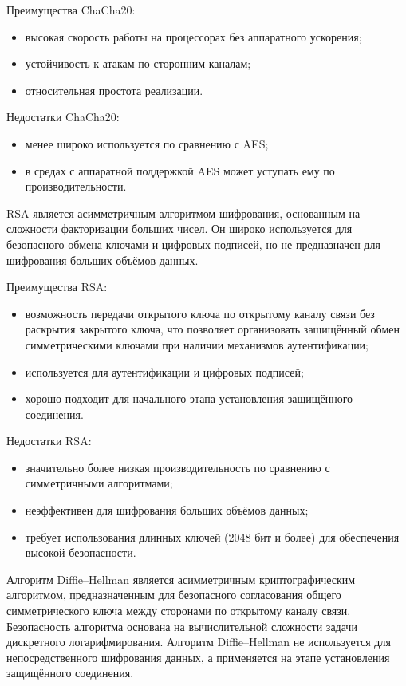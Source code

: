 Преимущества ChaCha20:

\begin{itemize}
    \item высокая скорость работы на процессорах без аппаратного ускорения;
    \item устойчивость к атакам по сторонним каналам;
    \item относительная простота реализации.
\end{itemize}

Недостатки ChaCha20:

\begin{itemize}
    \item менее широко используется по сравнению с AES;
    \item в средах с аппаратной поддержкой AES может уступать ему по производительности.
\end{itemize}

RSA является асимметричным алгоритмом шифрования, основанным на сложности факторизации больших чисел. Он широко используется для безопасного обмена ключами и цифровых подписей, но не предназначен для шифрования больших объёмов данных.

Преимущества RSA:

\begin{itemize}
    \item возможность передачи открытого ключа по открытому каналу связи без раскрытия закрытого ключа, что позволяет организовать защищённый обмен симметрическими ключами при наличии механизмов аутентификации;
    \item используется для аутентификации и цифровых подписей;
    \item хорошо подходит для начального этапа установления защищённого соединения.
\end{itemize}

Недостатки RSA:

\begin{itemize}
    \item значительно более низкая производительность по сравнению с симметричными алгоритмами;
    \item неэффективен для шифрования больших объёмов данных;
    \item требует использования длинных ключей (2048 бит и более) для обеспечения высокой безопасности.
\end{itemize}


Алгоритм Diffie--Hellman является асимметричным криптографическим алгоритмом, предназначенным для безопасного согласования общего симметрического ключа между сторонами по открытому каналу связи. Безопасность алгоритма основана на вычислительной сложности задачи дискретного логарифмирования. Алгоритм Diffie--Hellman не используется для непосредственного шифрования данных, а применяется на этапе установления защищённого соединения.

